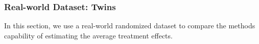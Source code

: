\documentclass[letterpaper]{article} %
\begin{document}
%
\subsubsection{Real-world Dataset: Twins}
In this section, we use a real-world randomized dataset to compare the methods capability of estimating the average treatment effects.
\end{document}
